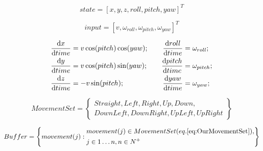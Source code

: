 \documentclass[a4paper,narrowmargins,12pt,twoside,openright,onehalfspaced,singlespacednotes]{fcup-thesis}
\theoremstyle{plain}
\theoremstyle{plain}
\theoremstyle{remark}
\begin{document}
	\setcounter{chapter}{6}
	\setcounter{equation}{0}
	\begin{equation}\label{eq:simple3dStatevector}
		state = \left [ x,y,z, roll, pitch, yaw \right]^T
	\end{equation}
	
	\setcounter{chapter}{6}
	\setcounter{equation}{1}
	\begin{equation}\label{eq:simple3dInputVector}
		input = \left [ v, \omega_{roll}, \omega_{pitch},\omega_{yaw}\right ]^T
	\end{equation}
	
	\setcounter{chapter}{6}
	\setcounter{equation}{3}
	\begin{equation}\label{eq:UASNonlinearModelSimple}
		\begin{aligned}
			\frac{\text{d} x}{\text{d} time} &= v\cos(pitch)\cos(yaw);\\
			\frac{\text{d} y}{\text{d} time} &= v\cos(pitch)\sin(yaw);\\
			\frac{\text{d} z}{\text{d} time} &= -v\sin(pitch);\\
		\end{aligned}\\\quad\quad
		\begin{aligned}
			\frac{\text{d} roll}{\text{d} time} &= \omega_{roll};\\
			\frac{\text{d} pitch}{\text{d} time} &= \omega_{pitch};\\
			\frac{\text{d} yaw}{\text{d} time} &= \omega_{yaw};\\
		\end{aligned}
	\end{equation}
	
	\setcounter{chapter}{6}
	\setcounter{equation}{10}
	\begin{equation}\label{eq:OurMovementSet}
        Movement Set= \left\{
        \begin{gathered}
            Straight, Left,Right, Up, Down,\\
            Down Left, Down Right,  Up Left,   Up Right
        \end{gathered}
        \right\}
    \end{equation}
	
	\setcounter{chapter}{6}
	\setcounter{equation}{11}
	\begin{equation}\label{eq:ourBuffer}
		Buffer = \left\{
					movement(j):
					\begin{aligned}
						&movement(j)\in Movement Set (eq. \ref{eq:OurMovementSet}),\\
						& j \in 1\dots n, n \in N^+
					\end{aligned}
				\right\}
	\end{equation}
\end{document}
